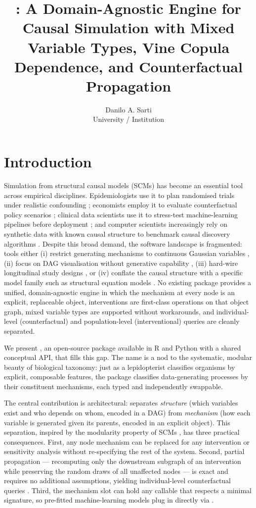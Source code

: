 \documentclass[article]{jss}
\author{Danilo A. Sarti\\University / Institution}
\title{\pkg{lepidoptera}: A Domain-Agnostic Engine for Causal Simulation with Mixed Variable Types, Vine Copula Dependence, and Counterfactual Propagation}
\begin{document}
\section{Introduction}
\label{sec:intro}

Simulation from structural causal models (SCMs) has become an essential tool across empirical disciplines. Epidemiologists use it to plan randomised trials under realistic confounding \citep{hernan2020causal}; economists employ it to evaluate counterfactual policy scenarios \citep{angrist2009mostly}; clinical data scientists use it to stress-test machine-learning pipelines before deployment \citep{vanderschueren2023}; and computer scientists increasingly rely on synthetic data with known causal structure to benchmark causal discovery algorithms \citep{spirtes2000causation, glymour2019review}. Despite this broad demand, the software landscape is fragmented: tools either (i) restrict generating mechanisms to continuous Gaussian variables \citep{scutari2010bnlearn}, (ii) focus on DAG visualisation without generative capability \citep{textor2016dagitty}, (iii) hard-wire longitudinal study designs \citep{sofrygin2017simcausal}, or (iv) conflate the causal structure with a specific model family such as structural equation models \citep{holst2013lava}. No existing package provides a unified, domain-agnostic engine in which the mechanism at every node is an explicit, replaceable object, interventions are first-class operations on that object graph, mixed variable types are supported without workarounds, and individual-level (counterfactual) and population-level (interventional) queries are cleanly separated.

We present , an open-source package available in R and Python with a shared conceptual API, that fills this gap. The name is a nod to the systematic, modular beauty of biological taxonomy: just as a lepidopterist classifies organisms by explicit, composable features, the package classifies data-generating processes by their constituent mechanisms, each typed and independently swappable.

The central contribution is architectural:  separates \emph{structure} (which variables exist and who depends on whom, encoded in a DAG) from \emph{mechanism} (how each variable is generated given its parents, encoded in an explicit  object). This separation, inspired by the modularity property of SCMs \citep{pearl2009causality, peters2017elements}, has three practical consequences. First, any node mechanism can be replaced for any intervention or sensitivity analysis without re-specifying the rest of the system. Second, partial propagation --- recomputing only the downstream subgraph of an intervention while preserving the random draws of all unaffected nodes --- is exact and requires no additional assumptions, yielding individual-level counterfactual queries \citep{pearl2009causality, shpitser2007identification}. Third, the mechanism slot can hold any callable that respects a minimal signature, so pre-fitted machine-learning models plug in directly via .
\end{document}
